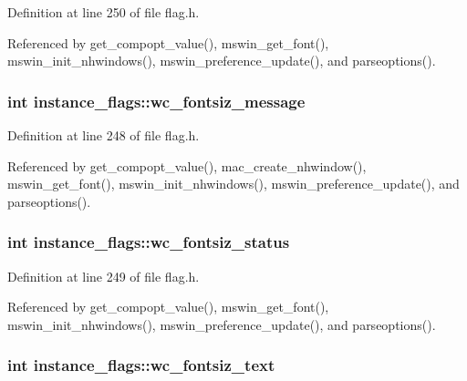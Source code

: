 Definition at line 250 of file flag.\+h.



Referenced by get\+\_\+compopt\+\_\+value(), mswin\+\_\+get\+\_\+font(), mswin\+\_\+init\+\_\+nhwindows(), mswin\+\_\+preference\+\_\+update(), and parseoptions().

\hypertarget{structinstance__flags_a926efa0da25728957b82ffd8ac0c2ef9}{
\subsubsection[{wc\+\_\+fontsiz\+\_\+message}]{\setlength{\rightskip}{0pt plus 5cm}int instance\+\_\+flags\+::wc\+\_\+fontsiz\+\_\+message}}\label{structinstance__flags_a926efa0da25728957b82ffd8ac0c2ef9}


Definition at line 248 of file flag.\+h.



Referenced by get\+\_\+compopt\+\_\+value(), mac\+\_\+create\+\_\+nhwindow(), mswin\+\_\+get\+\_\+font(), mswin\+\_\+init\+\_\+nhwindows(), mswin\+\_\+preference\+\_\+update(), and parseoptions().

\hypertarget{structinstance__flags_afc85b364ccf07dbaf9e752ed5989d55e}{
\subsubsection[{wc\+\_\+fontsiz\+\_\+status}]{\setlength{\rightskip}{0pt plus 5cm}int instance\+\_\+flags\+::wc\+\_\+fontsiz\+\_\+status}}\label{structinstance__flags_afc85b364ccf07dbaf9e752ed5989d55e}


Definition at line 249 of file flag.\+h.



Referenced by get\+\_\+compopt\+\_\+value(), mswin\+\_\+get\+\_\+font(), mswin\+\_\+init\+\_\+nhwindows(), mswin\+\_\+preference\+\_\+update(), and parseoptions().

\hypertarget{structinstance__flags_aed0e7dbf1efecc62fb651e1e6042cb78}{
\subsubsection[{wc\+\_\+fontsiz\+\_\+text}]{\setlength{\rightskip}{0pt plus 5cm}int instance\+\_\+flags\+::wc\+\_\+fontsiz\+\_\+text}}\label{structinstance__flags_aed0e7dbf1efecc62fb651e1e6042cb78}


